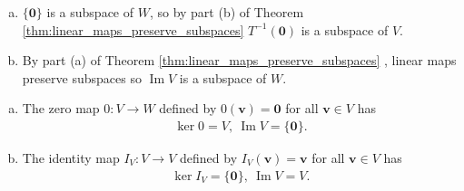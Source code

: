 \documentclass[12pt,letterpaper,reqno]{article}
\numberwithin{equation}{section}
\DeclareMathOperator{\im}{Im}
\begin{document}
\begin{pf}
\begin{enumerate}[(a)]
	\item $\{\mathbf{0}\}$ is a subspace of $W$, so by part (b) of Theorem \ref{thm:linear_maps_preserve_subspaces} $T^{-1}(\mathbf{0})$ is a subspace of $V$.
	\item By part (a) of Theorem \ref{thm:linear_maps_preserve_subspaces} , linear maps preserve subspaces so $\im V$ is a subspace of $W$.
\end{enumerate}	
\end{pf}

\begin{example}
\begin{enumerate}[(a)]
	\item The zero map $0:V \to W$ defined by $0(\mathbf{v})=\mathbf{0}$ for all $\mathbf{v} \in V$ has 
\begin{align*}
	\ker 0=V, \ \im V=\{\mathbf{0}\}.
\end{align*}
\item The identity map $I_V:V \to V$ defined by $I_V(\mathbf{v})=\mathbf{v}$ for all $\mathbf{v} \in V$ has 
\begin{align*}
	\ker I_V=\{\mathbf{0}\}, \ \im V=V.
\end{align*} 
\end{enumerate}	
\end{example}
\end{document}
